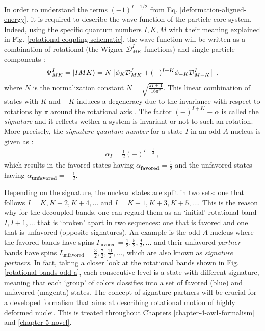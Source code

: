In order to understand the terms $(-1)^{I+1/2}$ from Eq. \ref{deformation-aligned-energy}, it is required to describe the wave-function of the particle-core system. Indeed, using the specific quantum numbers $I,K,M$ with their meaning explained in Fig. \ref{rotational-coupling-schematic}, the wave-function will be written as a combination of rotational (the Wigner-$\mathcal{D}_{MK}^I$ functions) and single-particle components \cite{wang2007exotic,davydov1958rotational}:
\begin{align}
    \Psi_{MK}^I=\ket{IMK}=N\left[\phi_K \mathcal{D}_{MK}^I+(-)^{I+K}\phi_{-K}\mathcal{D}_{M-K}^I\right]\ ,
    \label{RAL-bands-wave-function}
\end{align}
where $N$ is the normalization constant $N=\sqrt{\frac{2I+1}{16\pi^2}}$. This linear combination of states with $K$ and $-K$ induces a degeneracy due to the invariance with respect to rotations by $\pi$ around the rotational axis \cite{frauendorf1997tilted,bohr1998nuclear}. The factor $(-)^{I+K}\equiv\alpha$ is called the \emph{signature} and it reflects wether a system is invariant or not to such an rotation. More precisely, the \emph{signature quantum number} for a state $I$ in an odd-$A$ nucleus is given as \cite{sun1994varied}:
\begin{align}
    \alpha_I=\frac{1}{2}(-)^{I-\frac{1}{2}}\ ,
    \label{signature-quantum-number}
\end{align}
which results in the favored states having $\alpha_\textbf{favored}=\frac{1}{2}$ and the unfavored states having $\alpha_\textbf{unfavored}=-\frac{1}{2}$.

Depending on the signature, the nuclear states are split in two sets: one that follows $I=K,K+2,K+4,\dots$ and $I=K+1,K+3,K+5,\dots$. This is the reason why for the decoupled bands, one can regard them as an `initial' rotational band $I,I+1,\dots$ that is `broken' apart in two sequences: one that is favored and one that is unfavored (opposite signatures). An example is the odd-$A$ nucleus where the favored bands have spins $I_\text{favored}=\frac{1}{2},\frac{5}{2},\frac{9}{2},\dots$ and their unfavored \emph{partner} bands have spins $I_\text{unfavored}=\frac{3}{2},\frac{7}{2},\frac{11}{2},\dots$, which are also known as \emph{signature partners}. In fact, taking a closer look at the rotational bands shown in Fig. \ref{rotational-bands-odd-a}, each consecutive level is a state with different signature, meaning that each `group' of colors classifies into a set of favored (blue) and unfavored (magenta) states. The concept of signature partners will be crucial for a developed formalism that aims at describing rotational motion of highly deformed nuclei. This is treated throughout Chapters \ref{chapter-4-aw1-formalism} and \ref{chapter-5-novel}.

